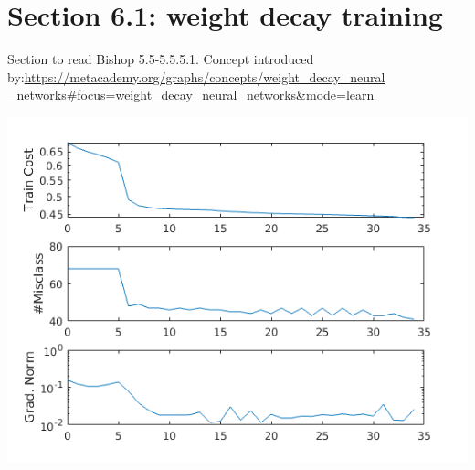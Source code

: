 \documentclass{article}
\begin{document}
\section{Section 6.1: weight decay training}

Section to read Bishop 5.5-5.5.5.1. Concept introduced by:\url{https://metacademy.org/graphs/concepts/weight_decay_neural
_networks#focus=weight_decay_neural_networks&mode=learn}

\includegraphics[width=\columnwidth]{ex1costw1.png}
\end{document}

